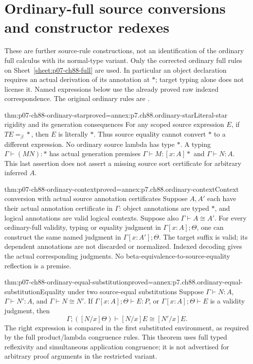 \section{Ordinary-full source conversions and constructor redexes}
\label{sec:p07-ch88-ordinary-checking}

These are further source-rule constructions, not an identification of the
ordinary full calculus with its normal-type variant. Only the corrected
ordinary full rules on Sheet~\ref{sheet:p07-ch88-full} are used. In
particular an object declaration requires an actual derivation of its
annotation at \(\ast\); target typing alone does not license it.
Named expressions below use the already proved raw indexed correspondence.
The original ordinary rules are \cite[pp.~99--102]{CoquandHuet1988}.

\begin{hblemma}{thm:p07-ch88-ordinary-star}{proved=annex:p7.ch88.ordinary-star}{Literal-star rigidity and its generation consequences}
For any scoped source expression \(E\), if \(TE=_\beta\ast\), then
\(E\) is literally \(\ast\). Thus source equality cannot convert
\(\ast\) to a different expression. No ordinary source lambda has
type \(\ast\). A typing \(\Gamma\vdash(MN):\ast\) has actual
generation premises \(\Gamma\vdash M:[x:A]\ast\) and
\(\Gamma\vdash N:A\). This last assertion does not assert a missing
source sort certificate for arbitrary inferred \(A\).
\end{hblemma}

\begin{hbtheorem}{thm:p07-ch88-ordinary-context}{proved=annex:p7.ch88.ordinary-context}{Context conversion with actual source annotation certificates}
Suppose \(A,A'\) each have their actual annotation certificate in
\(\Gamma\): object annotations are typed \(\ast\), and logical
annotations are valid logical contexts. Suppose also
\(\Gamma\vdash A\cong A'\). For every ordinary-full validity,
typing or equality judgment in \(\Gamma[x:A];\Theta\), one can
construct the same named judgment in \(\Gamma[x:A'];\Theta\).
The target suffix is valid; its dependent annotations are not discarded
or normalized. Indexed decoding gives the actual corresponding judgments.
No beta-equivalence-to-source-equality reflection is a premise.
\end{hbtheorem}

\begin{hbtheorem}{thm:p07-ch88-ordinary-equal-substitution}{proved=annex:p7.ch88.ordinary-equal-substitution}{Equality under two source-equal substitutions}
Suppose \(\Gamma\vdash N:A\), \(\Gamma\vdash N':A\), and
\(\Gamma\vdash N\cong N'\). If
\(\Gamma[x:A];\Theta\vdash E:P\), or
\(\Gamma[x:A];\Theta\vdash E\) is a validity judgment, then
\[
 \Gamma;([N/x]\Theta)\vdash [N/x]E\cong[N'/x]E.
\]
The right expression is compared in the first substituted environment,
as required by the full product/lambda congruence rules. This theorem
uses full typed reflexivity and simultaneous application congruence;
it is not advertised for arbitrary proof arguments in the restricted
variant.
\end{hbtheorem}

